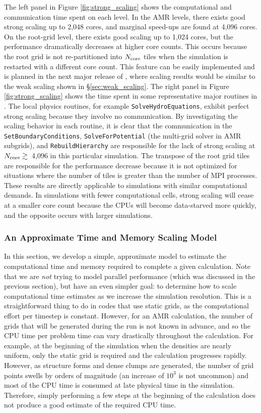 The left panel in Figure \ref{fig:strong_scaling} shows the
computational and communication time spent on each level.  In the AMR
levels, there exists good strong scaling up to 2,048 cores, and
marginal speed-ups are found at 4,096 cores.  On the root-grid level,
there exists good scaling up to 1,024 cores, but the performance
dramatically decreases at higher core counts.  This occurs because the
root grid is not re-partitioned into $N_{\rm core}$ tiles when the
simulation is restarted with a different core count.  This feature can
be easily implemented and is planned in the next major release of
\enzo, where scaling results would be similar to the weak scaling shown
in \S\ref{sec:weak_scaling}.  The right panel in Figure
\ref{fig:strong_scaling} shows the time spent in some representative
major routines in \enzo.  The local physics routines, for example
\texttt{SolveHydroEquations}, exhibit perfect strong scaling because
they involve no communication.  By investigating the scaling behavior
in each routine, it is clear that the communication in the
\texttt{SetBoundaryConditions}, \texttt{SolveForPotential} (the multi-grid
solver in AMR subgrids), and \texttt{RebuildHierarchy} are responsible
for the lack of strong scaling at $N_{\rm core} \gtrsim$~4,096 in this
particular simulation.  The transpose of the root grid tiles are
responsible for the performance decrease because it is not optimized
for situations where the number of tiles is greater than the number of
MPI processes.  These results are directly applicable to simulations
with similar computational demands.  In simulations with fewer
computational cells, strong scaling will cease at a smaller core count
because the CPUs will become data-starved more quickly, and the
opposite occurs with larger simulations.


\subsubsection{An Approximate Time and Memory Scaling Model}

In this section, we develop a simple, approximate model to estimate
the computational time and memory required to complete a given
calculation.  Note that we are {\it not} trying to model parallel
performance (which was discussed in the previous section), but have an
even simpler goal: to determine how to scale computational time
estimates as we increase the simulation resolution.  This is a
straightforward thing to do in codes that use static grids, as the
computational effort per timestep is constant.  However, for an AMR
calculation, the number of grids that will be generated during the run
is not known in advance, and so the CPU time per problem time can vary
drastically throughout the calculation.  For example, at the beginning
of the simulation when the densities are nearly uniform, only the
static grid is required and the calculation progresses rapidly.
However, as structure forms and dense clumps are generated, the number
of grid points swells by orders of magnitude (an increase of $10^3$ is
not uncommon) and most of the CPU time is consumed at late physical
time in the simulation.
Therefore, simply performing a few steps at the beginning of the
calculation does not produce a good estimate of the required CPU time.

